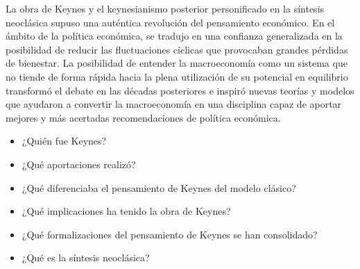 \documentclass{nuevotema}
\begin{document}
La obra de Keynes y el keynesianismo posterior personificado en la síntesis neoclásica supuso una auténtica revolución del pensamiento económico. En el ámbito de la política económica, se tradujo en una confianza generalizada en la posibilidad de reducir las fluctuaciones cíclicas que provocaban grandes pérdidas de bienestar. La posibilidad de entender la macroeconomía como un sistema que no tiende de forma rápida hacia la plena utilización de su potencial en equilibrio transformó el debate en las décadas posteriores e inspiró nuevas teorías y modelos que ayudaron a convertir la macroeconomía en una disciplina capaz de aportar mejores y más acertadas recomendaciones de política económica.

\begin{itemize}
	\item ¿Quién fue Keynes?
	\item ¿Qué aportaciones realizó?
	\item ¿Qué diferenciaba el pensamiento de Keynes del modelo clásico?
	\item ¿Qué implicaciones ha tenido la obra de Keynes?
	\item ¿Qué formalizaciones del pensamiento de Keynes se han consolidado?
	\item ¿Qué es la síntesis neoclásica?
\end{itemize}

\esquemacorto
\end{document}
